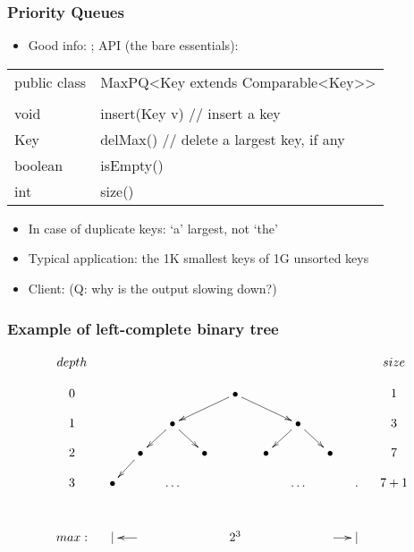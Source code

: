 \documentclass[handout]{beamer}
\newcommand{\git}{https://github.com/marcbezem/INF102/blob/master}
\begin{document}
\begin{frame}[fragile]
    \frametitle{Priority Queues}

\begin{itemize}[<+->]
\item Good info: \href{https://en.wikipedia.org/wiki/Priority_queue}%
{\color{red}{Wikipedia}}; API (the bare essentials):
\end{itemize}
{\tt\begin{tabular}{ll}
public class &MaxPQ<Key extends Comparable<Key>> \\
 \\
void       & insert(Key v)         // insert a key \\
Key         &   delMax()                // delete a largest key, if any\\
boolean& isEmpty()\\
int          &size()
\end{tabular}}
\begin{itemize}[<+->]
\item In case of duplicate keys: `a' largest, not `the'
\item Typical application: the 1K smallest keys of 1G unsorted keys
\item Client:
\href{\git/programs/sorting/priorityQueues/BottomM.java}%
{\color{red}{BottomM.java}} (Q: why is the output slowing down?)
\end{itemize}
\end{frame}

\begin{frame}
    \frametitle{Example of left-complete binary tree}
\[
\xymatrix@R=.4cm@C=.4cm{
depth&&&&&&&&&&size\\ 
0&&&&&\bullet\ar[dll]\ar[drr] &&&&&1\\ 
1&&&\bullet \ar[dl] \ar[dr]&&&&\bullet \ar[dl] \ar[dr] &&&3\\
2&&\bullet \ar[dl]&&\bullet&&\bullet&&\bullet&&7\\
3&\bullet&&\ldots&&&&\ldots&&.& 7+1\\
\\
max:&|&\ar[l]&&&2^3&&&\ar[r]&|&\\
}
\] 
\end{frame}
\end{document}

